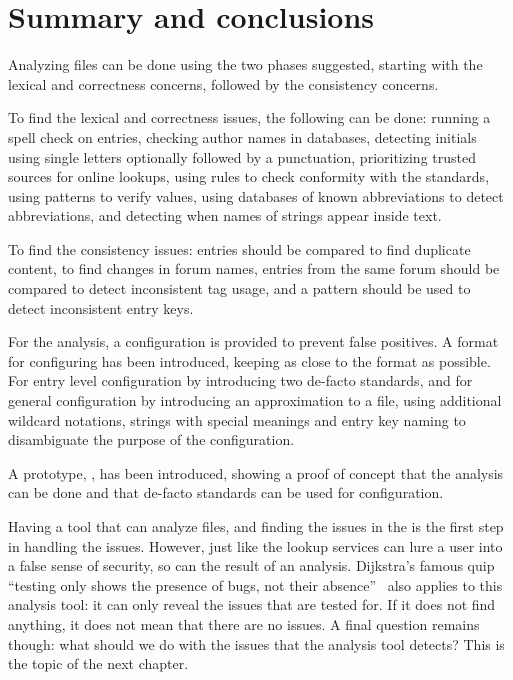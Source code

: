 \section{Summary and conclusions}

Analyzing {\bibtex} files can be done using the two phases suggested,
starting with the lexical and correctness concerns, followed by the
consistency concerns.

To find the lexical and correctness issues, the following can be done:
running a spell check on entries, checking author names in databases,
detecting initials using single letters optionally followed by a
punctuation, prioritizing trusted sources for online lookups, using
rules to check conformity with the standards, using patterns to verify
values, using databases of known abbreviations to detect
abbreviations, and detecting when names of strings appear inside text.

To find the consistency issues: entries should be compared to find
duplicate content, to find changes in forum names, entries from the
same forum should be compared to detect inconsistent tag usage, and a
pattern should be used to detect inconsistent entry keys.

For the analysis, a configuration is provided to prevent false
positives.  A format for configuring has been introduced, keeping as
close to the {\bibtex} format as possible.  For entry level
configuration by introducing two de-facto standards, and for general
configuration by introducing an approximation to a {\bibtex} file,
using additional wildcard notations, strings with special meanings and
entry key naming to disambiguate the purpose of the configuration.

A prototype, {\orangutan}, has been introduced, showing a proof of
concept that the analysis can be done and that de-facto standards can
be used for configuration.

Having a tool that can analyze {\bibtex} files, and finding the issues
in the  is the first step in handling the issues.  However,
just like the lookup services can lure a user into a false sense of
security, so can the result of an analysis.  Dijkstra's famous quip
``testing only shows the presence of bugs, not their
absence''~\cite{buxton1970_software} also applies to this analysis
tool: it can only reveal the issues that are tested for.  If it does
not find anything, it does not mean that there are no issues.  A final
question remains though: what should we do with the issues that the
analysis tool detects?  This is the topic of the next chapter.
